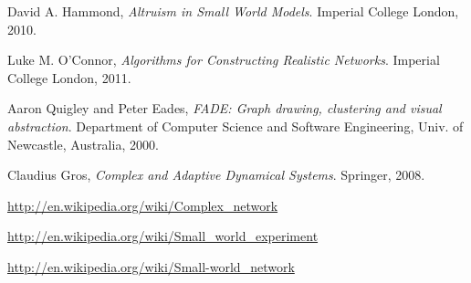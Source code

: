 \documentclass[a4paper,11pt,titlepage]{article}
\begin{document}
\begin{thebibliography}{9}

  David A. Hammond,
  \emph{Altruism in Small World Models}.
  Imperial College London,
  2010.

  Luke M. O'Connor,
  \emph{Algorithms for Constructing Realistic Networks}.
  Imperial College London,
  2011.

  Aaron Quigley and Peter Eades,
  \emph{FADE: Graph drawing, clustering and visual abstraction}.
  Department of Computer Science and Software Engineering,
  Univ. of  Newcastle, Australia, 2000.

Claudius Gros,
\emph{Complex and Adaptive Dynamical Systems}.
Springer,
2008.

  \url{http://en.wikipedia.org/wiki/Complex_network}

 \url{http://en.wikipedia.org/wiki/Small_world_experiment}

 \url{http://en.wikipedia.org/wiki/Small-world_network}

\end{thebibliography}
\end{document}
